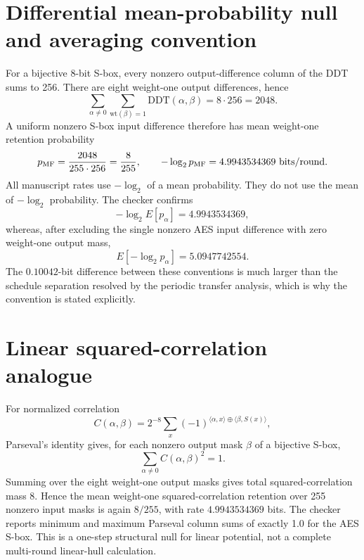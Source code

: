 \documentclass[cryptography,supfile,submit,oneauthor]{Definitions/mdpi}
\begin{document}
\section{Differential mean-probability null and averaging convention}
For a bijective 8-bit S-box, every nonzero output-difference column of the DDT sums to 256. There are eight weight-one output differences, hence
\[
\sum_{\alpha\ne0}\sum_{\mathrm{wt}(\beta)=1}\mathrm{DDT}(\alpha,\beta)=8\cdot256=2048.
\]
A uniform nonzero S-box input difference therefore has mean weight-one retention probability
\[
p_{\rm MF}=\frac{2048}{255\cdot256}=\frac{8}{255},\qquad
-\log_2 p_{\rm MF}=4.9943534369\ \text{bits/round}.
\]
All manuscript rates use $-\log_2$ of a mean probability. They do not use the mean of $-\log_2$ probability. The checker  confirms
\[
-\log_2 E[p_\alpha]=4.9943534369,
\]
whereas, after excluding the single nonzero AES input difference with zero weight-one output mass,
\[
E[-\log_2 p_\alpha]=5.0947742554.
\]
The $0.10042$-bit difference between these conventions is much larger than the schedule separation resolved by the periodic transfer analysis, which is why the convention is stated explicitly.

\section{Linear squared-correlation analogue}
For normalized correlation
\[
C(\alpha,\beta)=2^{-8}\sum_x(-1)^{\langle\alpha,x\rangle\oplus\langle\beta,S(x)\rangle},
\]
Parseval's identity gives, for each nonzero output mask $\beta$ of a bijective S-box,
\[
\sum_{\alpha\ne0} C(\alpha,\beta)^2=1.
\]
Summing over the eight weight-one output masks gives total squared-correlation mass 8. Hence the mean weight-one squared-correlation retention over 255 nonzero input masks is again $8/255$, with rate $4.9943534369$ bits. The checker reports minimum and maximum Parseval column sums of exactly 1.0 for the AES S-box. This is a one-step structural null for linear potential, not a complete multi-round linear-hull calculation.
\end{document}
